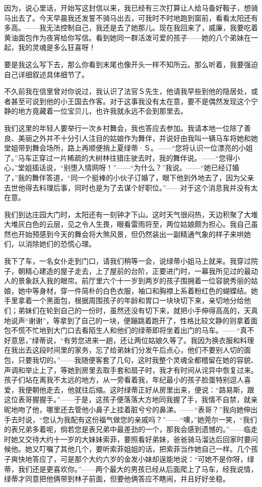 \documentclass[12pt,oneside]{book}
\begin{document}
因为，说心里话，开始写这封信以来，我已经有三次打算让人给马备好鞍子，想骑马出去了。今天早晨我还发誓不骑马出去，可我时不时地跑到窗前，看看太阳还有多高。——我无法控制自己，我还是去了她那儿。现在我回来了，威廉，我要吃着黄油面包作为夜宵给你写信。看到她同一群活泼可爱的孩子——她的八个弟妹在一起，我的灵魂是多么狂喜呀！

要是我这么写下去，那么你看到末尾也像开头一样不知所云。那么听着，我要强迫自己详细叙述具体细节了。

不久前我在信里曾对你说过，我认识了法官Ｓ先生，他请我早些到他的隐居处，或者甚至可说到他的小王国去作客。对于这事我没有太在意，要不是偶然发现这个宁静的地方竟藏着一位宝贝儿，也许我就永远不会到那里去。

我们这里的年轻人要举行一次乡村舞会，我也答应去参加。我请本地一位除了善良、美丽之外并不十分引人注目的姑娘作为舞伴，并说好由我叫一辆马车将她和她堂姐带到舞会场所，路上再顺便捎上夏绿蒂·Ｓ。——“您将认识一位漂亮的小姐了。”马车正穿过一片稀疏的大树林往猎庄驶去时，我的舞伴说。——“您得小心，”堂姐插话说，“别堕入情网呀！”——“为什么？”我说。——“她已经订婚了，”我的舞伴答道，“同一个挺棒的小伙子订婚了，眼下他到外地去了，因为父亲去世他得去料理后事，同时也是为了去谋个好职位。”——对于这个消息我并没有太在意。

我们到达庄园大门时，太阳还有一刻钟才下山。这时天气很闷热，天边积聚了大堆大堆灰白色的云层，见之令人生畏，眼看雷雨将至，两位姑娘颇为担心。我自己虽然也开始预感到今天的舞会将大煞风景，但仍然装出一副精通气象的样子来哄她们，以消除她们的恐慌心理。

我下了车，一名女仆走到门口，请我们稍等一会，说绿蒂小姐马上就来。我穿过院子，朝精心建造的屋子走去，上了屋前的台阶，正要进门时，一幕我所见过的最动人的景象跃入我的眼帘。前厅里六个十一岁到两岁的孩子围拥着一位容貌秀丽的姑娘，她中等身材，穿一件简朴的白色衣服，袖口和胸襟上系着粉红色的蝴蝶结。她手里拿着一个黑面包，根据周围孩子的年龄和胃口一块块切下来，亲切地分给他们；弟妹们在轮到自己的一份时，虽然还没有切下来，就把小手伸得高高的，天真地说声“谢谢”，等拿到了自己的一块，便蹦跳着跑开了，性格比较文静的则拿着面包不慌不忙地到大门口去看陌生人和他们的绿蒂即将坐着出门的马车。——“真不好意思，”绿蒂说，“有劳您进来一趟，还让两位姑娘久等了。我因为换衣服和料理在我出去这段时间里的家务，忘了给弟妹们分发午后点心，他们不要别人切的面包，只要我切的。”——我随便客套了几句，这时我整个灵魂全都稽留在她的容貌、声调和举止上了，等她到房里去取手套和扇子时，我才有时间从诧异中恢复过来。孩子们站在离我不太远的地方，从一旁看着我，年纪最小的孩子脸蛋特别逗人喜爱，我便朝他走去，他就往后缩。这时绿蒂正好从房里出来，便说：“路易斯，跟这位表哥握握手。”——于是，这孩子便落落大方地同我握了手，我情不自禁，就亲昵地吻了他，哪里还去管他小鼻子上挂着脏兮兮的鼻涕。——“表哥？”我向她伸出手去时说，“您认为我配有这份福气做您的亲戚吗？”——“噢，”她莞尔一笑，“我们的表兄弟多着呢，倘若您是表兄弟中最差劲的一个，那我会感到遗憾的。”——临走时她又交待大约十一岁的大妹妹索菲，要照看好弟妹，爸爸骑马溜达后回家时要问候他。她又叮嘱了其他几个，要听索菲姐姐的话，把索菲当作她自己一样。几个孩子爽快地答应了，可是那个大约六岁的金发小妹却逞能地说：“可她不是你呀，绿蒂，我们还是更喜欢你。”——两个最大的男孩已经从后面爬上了马车，经我说情，绿蒂才同意把他俩带到林子前面，但要他俩答应不瞎闹，并且好好坐稳。
\end{document}
